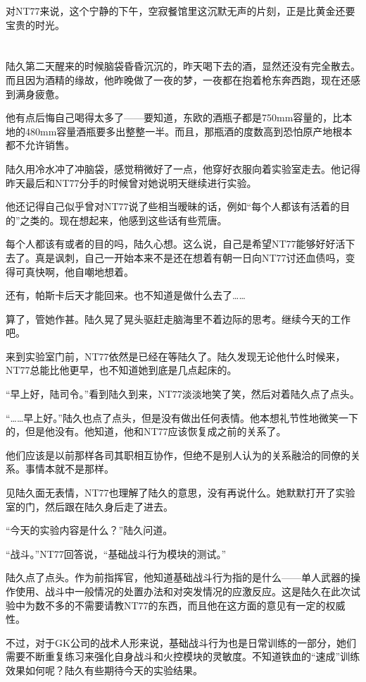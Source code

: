 对NT77来说，这个宁静的下午，空寂餐馆里这沉默无声的片刻，正是比黄金还要宝贵的时光。\section*{}

陆久第二天醒来的时候脑袋昏昏沉沉的，昨天喝下去的酒，显然还没有完全散去。而且因为酒精的缘故，他昨晚做了一夜的梦，一夜都在抱着枪东奔西跑，现在还感到满身疲惫。

他有点后悔自己喝得太多了——要知道，东欧的酒瓶子都是750mm容量的，比本地的480mm容量酒瓶要多出整整一半。而且，那瓶酒的度数高到恐怕原产地根本都不允许销售。

陆久用冷水冲了冲脑袋，感觉稍微好了一点，他穿好衣服向着实验室走去。他记得昨天最后和NT77分手的时候曾对她说明天继续进行实验。

他还记得自己似乎曾对NT77说了些相当暧昧的话，例如“每个人都该有活着的目的”之类的。现在想起来，他感到这些话有些荒唐。

每个人都该有或者的目的吗，陆久心想。这么说，自己是希望NT77能够好好活下去了。真是讽刺，自己一开始本来不是还在想着有朝一日向NT77讨还血债吗，变得可真快啊，他自嘲地想着。

还有，帕斯卡后天才能回来。也不知道是做什么去了……

算了，管她作甚。陆久晃了晃头驱赶走脑海里不着边际的思考。继续今天的工作吧。

来到实验室门前，NT77依然是已经在等陆久了。陆久发现无论他什么时候来，NT77总能比他更早，也不知道她到底是几点起床的。

“早上好，陆司令。”看到陆久到来，NT77淡淡地笑了笑，然后对着陆久点了点头。

“……早上好。”陆久也点了点头，但是没有做出任何表情。他本想礼节性地微笑一下的，但是他没有。他知道，他和NT77应该恢复成之前的关系了。

他们应该是以前那样各司其职相互协作，但绝不是别人认为的关系融洽的同僚的关系。事情本就不是那样。

见陆久面无表情，NT77也理解了陆久的意思，没有再说什么。她默默打开了实验室的门，然后跟在陆久身后走了进去。

“今天的实验内容是什么？”陆久问道。

“战斗。”NT77回答说，“基础战斗行为模块的测试。”

陆久点了点头。作为前指挥官，他知道基础战斗行为指的是什么——单人武器的操作使用、战斗中一般情况的处置办法和对突发情况的应激反应。这是陆久在此次试验中为数不多的不需要请教NT77的东西，而且他在这方面的意见有一定的权威性。

不过，对于GK公司的战术人形来说，基础战斗行为也是日常训练的一部分，她们需要不断重复练习来强化自身战斗和火控模块的灵敏度。不知道铁血的“速成”训练效果如何呢？陆久有些期待今天的实验结果。

